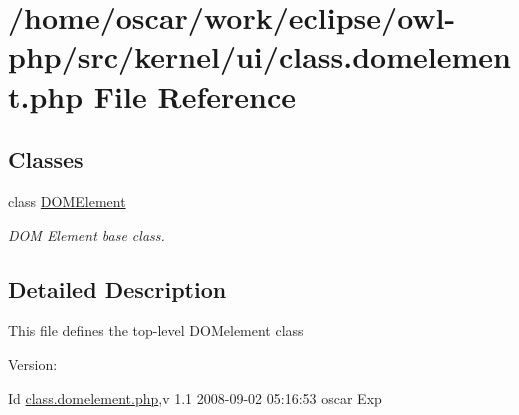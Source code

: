 \hypertarget{class_8domelement_8php}{
\section{/home/oscar/work/eclipse/owl-php/src/kernel/ui/class.domelement.php File Reference}
\label{class_8domelement_8php}
}
\subsection*{Classes}
\begin{CompactItemize}
\item 
class \hyperlink{classDOMElement}{DOMElement}
\begin{CompactList}\small\item\em DOM Element base class. \item\end{CompactList}\end{CompactItemize}


\subsection{Detailed Description}
This file defines the top-level DOMelement class \begin{Desc}
\item[Version:]\end{Desc}
\begin{Desc}
\item[Id]\hyperlink{class_8domelement_8php}{class.domelement.php},v 1.1 2008-09-02 05:16:53 oscar Exp \end{Desc}
